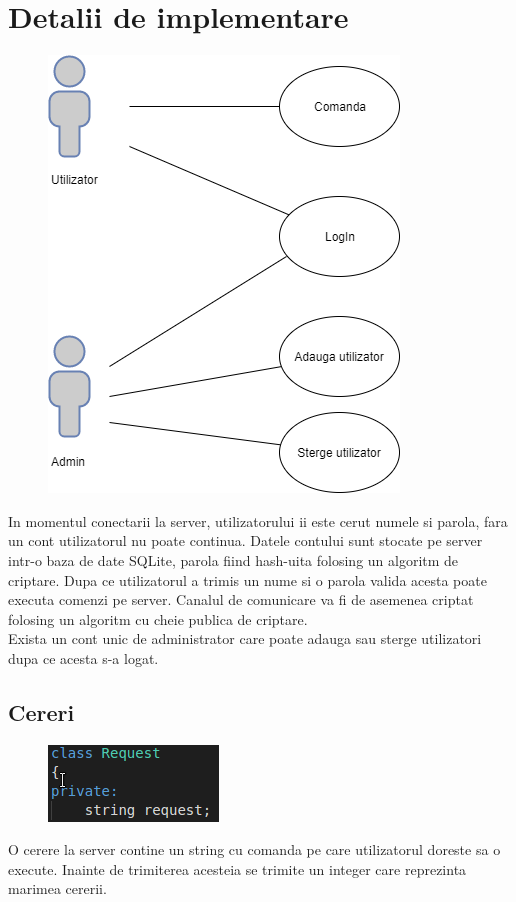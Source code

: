 \documentclass{llncs}
\begin{document}
\section{Detalii de implementare}
%
\begin{figure}
\includegraphics[width=0.5\linewidth]{Usecase.png}
\end{figure}

In momentul conectarii la server, utilizatorului ii este cerut numele si parola, fara un cont utilizatorul nu poate continua. Datele contului sunt stocate pe server intr-o baza de date SQLite, parola fiind hash-uita folosing un algoritm de criptare. Dupa ce utilizatorul a trimis un nume si o parola valida acesta poate executa comenzi pe server. Canalul de comunicare va fi de asemenea criptat folosing un algoritm cu cheie publica de criptare.\\

Exista un cont unic de administrator care poate adauga sau sterge utilizatori dupa ce acesta s-a logat.

\subsection{Cereri}
\begin{figure}
\includegraphics[width=0.4\linewidth]{request.png}
\end{figure}

O cerere la server contine un string cu comanda pe care utilizatorul doreste sa o execute. Inainte de trimiterea acesteia se trimite un integer care reprezinta marimea cererii.
%
\end{document}
